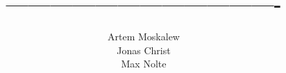 \documentclass[scrreprt,colorback,accentcolor=tud9b, 11pt]{tudreport}
\begin{document}
    \title{-------------------------------------}
    \subtitle{Artem Moskalew \\ Jonas Christ \\ Max Nolte}
    \maketitle

    \tableofcontents

%    


\listoffigures
\end{document}
